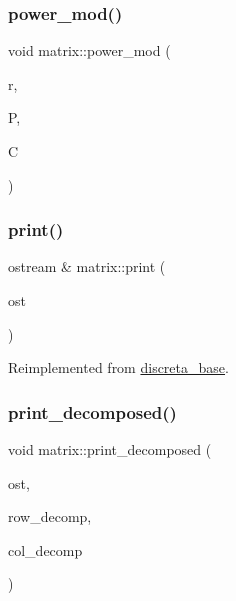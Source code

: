 \subsubsection{\texorpdfstring{power\+\_\+mod()}{power\_mod()}}
{\footnotesize\ttfamily void matrix\+::power\+\_\+mod (\begin{DoxyParamCaption}\item[{\mbox{\hyperlink{galois_8h_a09fddde158a3a20bd2dcadb609de11dc}{I\+NT}}}]{r,  }\item[{\mbox{\hyperlink{classinteger}{integer}} \&}]{P,  }\item[{\mbox{\hyperlink{classmatrix}{matrix}} \&}]{C }\end{DoxyParamCaption})}

\mbox{\label{classmatrix_aeb24c2fe68cc0a32d172c0fc06103dd2}} 
\subsubsection{\texorpdfstring{print()}{print()}}
{\footnotesize\ttfamily ostream \& matrix\+::print (\begin{DoxyParamCaption}\item[{ostream \&}]{ost }\end{DoxyParamCaption})\hspace{0.3cm}{\ttfamily [virtual]}}



Reimplemented from \mbox{\hyperlink{classdiscreta__base_a036e48bc058347046fc9b73dd0951478}{discreta\+\_\+base}}.

\mbox{\label{classmatrix_afd1ff3d3d7b507287af6891d94771bab}} 
\subsubsection{\texorpdfstring{print\+\_\+decomposed()}{print\_decomposed()}}
{\footnotesize\ttfamily void matrix\+::print\+\_\+decomposed (\begin{DoxyParamCaption}\item[{ostream \&}]{ost,  }\item[{\mbox{\hyperlink{class_vector}{Vector}} \&}]{row\+\_\+decomp,  }\item[{\mbox{\hyperlink{class_vector}{Vector}} \&}]{col\+\_\+decomp }\end{DoxyParamCaption})}


